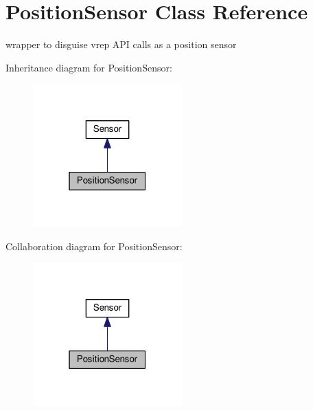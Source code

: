 \hypertarget{classPositionSensor}{}\section{Position\+Sensor Class Reference}
\label{classPositionSensor}


wrapper to disguise vrep A\+PI calls as a position sensor  




Inheritance diagram for Position\+Sensor\+:\nopagebreak
\begin{figure}[H]
\begin{center}
\leavevmode
\includegraphics[width=163pt]{classPositionSensor__inherit__graph}
\end{center}
\end{figure}


Collaboration diagram for Position\+Sensor\+:\nopagebreak
\begin{figure}[H]
\begin{center}
\leavevmode
\includegraphics[width=163pt]{classPositionSensor__coll__graph}
\end{center}
\end{figure}
